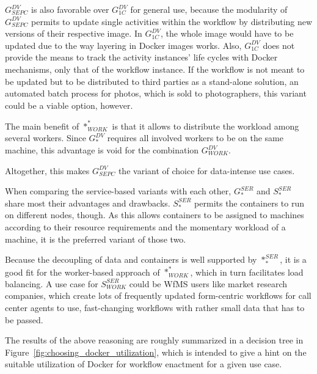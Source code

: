   $G_{SEPC}^{DV}$ is also favorable over $G_{1C}^{DV}$ for general use, because the modularity of $G_{SEPC}^{DV}$ permits to update single activities within the workflow by distributing new versions of their respective image. In $G_{1C}^{DV}$, the whole image would have to be updated due to the way layering in Docker images works. Also, $G_{1C}^{DV}$ does not provide the means to track the activity instances' life cycles with Docker mechanisms, only that of the workflow instance. If the workflow is not meant to be updated but to be distributed to third parties as a stand-alone solution, \eg an automated batch process for photos, which is sold to photographers, this variant could be a viable option, however.

  The main benefit of $*_{WORK}^{*}$ is that it allows to distribute the workload among several workers. Since $G_{*}^{DV}$ requires all involved workers to be on the same machine, this advantage is void for the combination $G_{WORK}^{DV}$.

  Altogether, this makes $G_{SEPC}^{DV}$ the variant of choice for data-intense use cases.

  When comparing the service-based variants with each other, $G_{*}^{SER}$ and $S_{*}^{SER}$ share most their advantages and drawbacks. $S_{*}^{SER}$ permits the containers to run on different nodes, though. As this allows containers to be assigned to machines according to their resource requirements and the momentary workload of a machine, it is the preferred variant of those two.

  Because the decoupling of data and containers is well supported by $*_{*}^{SER}$, it is a good fit for the worker-based approach of $*_{WORK}^{*}$, which in turn facilitates load balancing. A use case for $S_{WORK}^{SER}$ could be \ac{WfMS} users like market research companies, which create lots of frequently updated form-centric workflows for call center agents to use, \ie fast-changing workflows with rather small data that has to be passed.

  The results of the above reasoning are roughly summarized in a decision tree in Figure~\ref{fig:choosing_docker_utilization}, which is intended to give a hint on the suitable utilization of Docker for workflow enactment for a given use case.

